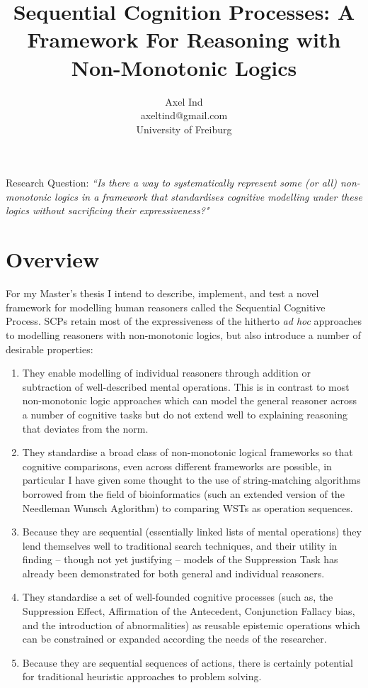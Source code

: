 \documentclass{article}
\begin{document}
\title{Sequential Cognition Processes: A Framework For Reasoning with Non-Monotonic Logics}
\author{Axel Ind \\ axeltind@gmail.com \\ University of Freiburg}

\maketitle

Research Question: \textit{``Is there a way to systematically represent some (or all) non-monotonic logics in a framework that standardises cognitive modelling under these logics without sacrificing their expressiveness?"}

\section{Overview}
For my Master's thesis I intend to describe, implement, and test a novel framework for modelling human reasoners called the Sequential Cognitive Process. SCPs retain most of the expressiveness of the hitherto \textit{ad hoc} approaches to modelling reasoners with non-monotonic logics, but also introduce a number of desirable properties:
\begin{enumerate}
\item They enable modelling of individual reasoners through addition or subtraction of well-described mental operations. This is in contrast to most non-monotonic logic approaches which can model the general reasoner across a number of cognitive tasks but do not extend well to explaining reasoning that deviates from the norm.
\item They standardise a broad class of non-monotonic logical frameworks so that cognitive comparisons, even across different frameworks are possible, in particular I have given some thought to the use of string-matching algorithms borrowed from the field of bioinformatics (such an extended version of the Needleman Wunsch Aglorithm\cite{needleman1970general}) to comparing WSTs as operation sequences.
\item Because they are sequential (essentially linked lists of mental operations) they lend themselves well to traditional search techniques, and their utility in finding -- though not yet justifying -- models of the Suppression Task has already been demonstrated for both general and individual reasoners.
\item They standardise a set of well-founded cognitive processes (such as, the Suppression Effect, Affirmation of the Antecedent, Conjunction Fallacy bias, and the introduction of abnormalities) as reusable epistemic operations which can be constrained or expanded according the needs of the researcher.
\item Because they are sequential sequences of actions, there is certainly potential for traditional heuristic approaches to problem solving.
\end{enumerate}
\end{document}
